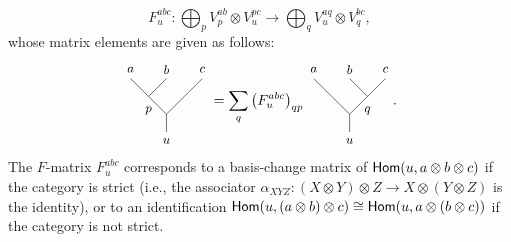 	\begin{equation}
		F_u^{abc}:\bigoplus_p V_p^{ab}\otimes V_u^{pc}\to \bigoplus_q V_u^{aq}\otimes V_q^{bc},
	\end{equation}
whose matrix elements are given as follows:
	\begin{equation}
		\label{eq:Fmove}
		\begin{tikzpicture}[baseline=(current bounding box.center),yscale=0.9,xscale=0.9]
			\draw (0,0.5) -- (0,1);
			\draw (0,1) -- (-0.5,1.5);
			\draw (-0.5,1.5) -- (-1,2);
			\draw (-0.5,1.5) -- (0,2);
			\draw (0,1) -- (0.5,1.5);
			\draw (0.5,1.5) -- (1,2);
			\node at (0,0.25) {\small $u$};
			\node at (-1,2.25) {\small $a$};
			\node at (0,2.25) {\small $b$};
			\node at (1,2.25) {\small $c$};
			\node at (-0.5,1.1) {\small $p$};
		\end{tikzpicture}=\sum_q \left(F_u^{abc}\right)_{qp}
		\begin{tikzpicture}[baseline=(current bounding box.center),yscale=0.9,xscale=0.9]
			\draw (0,0.5) -- (0,1);
			\draw (0,1) -- (-0.5,1.5);
			\draw (-0.5,1.5) -- (-1,2);
			\draw (0.5,1.5) -- (0,2);
			\draw (0,1) -- (0.5,1.5);
			\draw (0.5,1.5) -- (1,2);
			\node at (0,0.25) {\small $u$};
			\node at (-1,2.25) {\small $a$};
			\node at (0,2.25) {\small $b$};
			\node at (1,2.25) {\small $c$};
			\node at (0.5,1.1) {\small $q$};
		\end{tikzpicture}.
	\end{equation}
The $F$-matrix $F_u^{abc}$ corresponds to a basis-change matrix of $\mathsf{Hom}(u,a\otimes b\otimes c)$ if the category is strict (i.e., the associator $\alpha_{XYZ}:(X\otimes Y)\otimes Z\to X\otimes(Y\otimes Z)$ is the identity), or to an identification $\mathsf{Hom}(u,(a\otimes b)\otimes c)\cong\mathsf{Hom}(u,a\otimes(b\otimes c))$ if the category is not strict.

